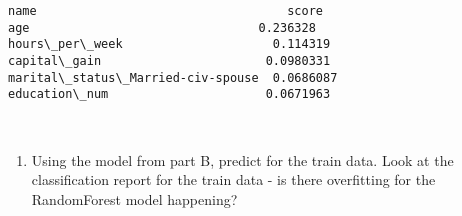 \documentclass[11pt]{article}
\providecommand{\tightlist}{%
      \setlength{\itemsep}{0pt}\setlength{\parskip}{0pt}}
\begin{document}
    \begin{Verbatim}[commandchars=\\\{\}]
name                                   score
age                                0.236328
hours\_per\_week                     0.114319
capital\_gain                       0.0980331
marital\_status\_Married-civ-spouse  0.0686087
education\_num                      0.0671963

    \end{Verbatim}

    \begin{center}
    \end{center}
    { \hspace*{\fill} \\}
    
    \begin{enumerate}
\def\labelenumi{\alph{enumi})}
\setcounter{enumi}{5}
\tightlist
\item
  Using the model from part B, predict for the train data. Look at the
  classification report for the train data - is there overfitting for
  the RandomForest model happening?
\end{enumerate}
\end{document}
